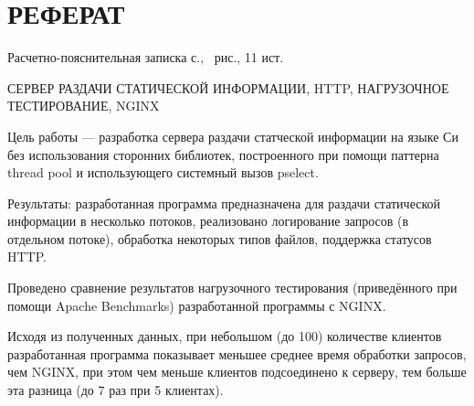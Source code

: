 \section*{\large РЕФЕРАТ}

Расчетно-пояснительная записка \pageref{LastPage} с., \totalfigures\ рис., 11 ист.

СЕРВЕР РАЗДАЧИ СТАТИЧЕСКОЙ ИНФОРМАЦИИ, HTTP, НАГРУЗОЧНОЕ ТЕСТИРОВАНИЕ, NGINX


Цель работы ---  разработка сервера раздачи статческой информации на языке Си без использования сторонних библиотек, построенного при помощи паттерна thread pool и использующего системный вызов pselect.

Результаты: разработанная программа предназначена для раздачи статической информации в несколько потоков, реализовано логирование запросов (в отдельном потоке), обработка некоторых типов файлов, поддержка статусов HTTP.

Проведено сравнение результатов нагрузочного тестирования (приведённого при помощи Apache Benchmarks) разработанной программы с NGINX.

Исходя из полученных данных, при небольшом (до 100) количестве клиентов разработанная программа показывает меньшее среднее время обработки запросов, чем NGINX, при этом чем меньше клиентов подсоединено к серверу, тем больше эта разница (до 7 раз при 5 клиентах).


\pagebreak